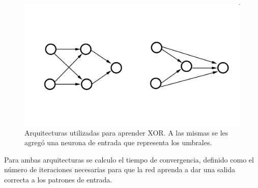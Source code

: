 \documentclass[aps,prb,onecolumn,10pt,floatfix,superscriptaddress]{article} %
\begin{document}
\begin{figure}[!htd] 
   	\includegraphics[scale=0.25 ]{xor.png}
   	\begin{center}
  \caption{\label{arq1} Arquitecturas utilizadas para aprender XOR. A las mismas se les agreg\'o una neurona de entrada que representa los umbrales.}
     	    \end{center}
 \end{figure}

Para ambas arquitecturas se calculo el tiempo de convergencia, definido como el n\'umero de iteraciones necesarias para que la red aprenda a dar una salida correcta a los patrones de entrada.
\end{document}
